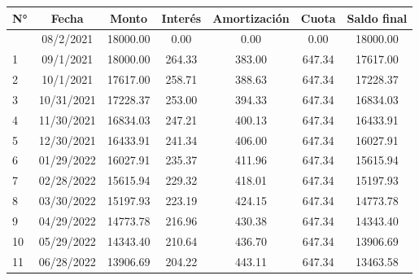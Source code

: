 \documentclass[a4paper,openright,12pt]{book}
\begin{document}
\begin{table}[H]
\begin{tabular}{lcccccc}
\hline
\multicolumn{1}{c}{\textbf{N°}} & \textbf{Fecha} & \textbf{Monto} & \textbf{Interés} & \textbf{Amortización} & \textbf{Cuota} & \textbf{Saldo final} \\ \hline
                                & 08/2/2021      & 18000.00       & 0.00             & 0.00                  & 0.00           & 18000.00             \\
1                               & 09/1/2021      & 18000.00       & 264.33           & 383.00                & 647.34         & 17617.00             \\
2                               & 10/1/2021      & 17617.00       & 258.71           & 388.63                & 647.34         & 17228.37             \\
3                               & 10/31/2021     & 17228.37       & 253.00           & 394.33                & 647.34         & 16834.03             \\
4                               & 11/30/2021     & 16834.03       & 247.21           & 400.13                & 647.34         & 16433.91             \\
5                               & 12/30/2021     & 16433.91       & 241.34           & 406.00                & 647.34         & 16027.91             \\
6                               & 01/29/2022     & 16027.91       & 235.37           & 411.96                & 647.34         & 15615.94             \\
7                               & 02/28/2022     & 15615.94       & 229.32           & 418.01                & 647.34         & 15197.93             \\
8                               & 03/30/2022     & 15197.93       & 223.19           & 424.15                & 647.34         & 14773.78             \\
9                               & 04/29/2022     & 14773.78       & 216.96           & 430.38                & 647.34         & 14343.40             \\
10                              & 05/29/2022     & 14343.40       & 210.64           & 436.70                & 647.34         & 13906.69             \\
11                              & 06/28/2022     & 13906.69       & 204.22           & 443.11                & 647.34         & 13463.58             \\

\end{tabular}
\end{table}
\end{document}

